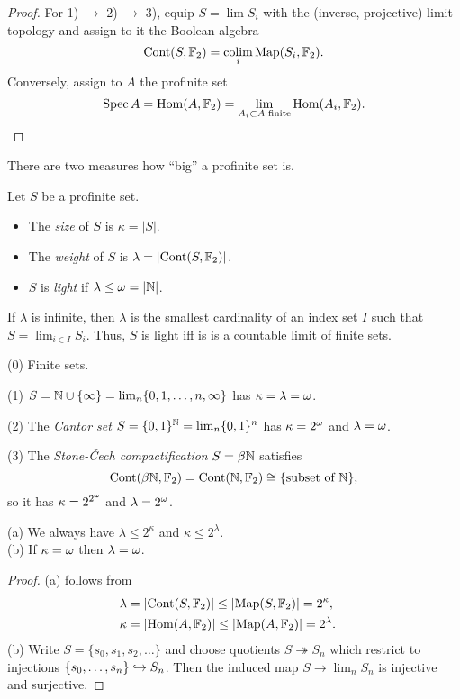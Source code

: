 \documentclass{notes}
\begin{document}
\begin{proof}
For 1) $\to$ 2) $\to$ 3), equip $S=\lim S_i$ with the (inverse,
projective) limit topology and assign to it the Boolean algebra
$$
   {\rm Cont}(S,{\mathbb{F}}_2) = \operatorname*{colim}_i{\rm Map}(S_i,{\mathbb{F}}_2).
$$
Conversely, assign to $A$ the profinite set
$$
  \operatorname{Spec} A = \mathrm{Hom}(A,{\mathbb{F}}_2) = \lim_{A_i\subset A\text{ finite}}\mathrm{Hom}(A_i,{\mathbb{F}}_2).
$$
\end{proof}

There are two measures how ``big'' a profinite set is.

\begin{defi}
Let $S$ be a profinite set. 
\begin{itemize}
\item The {\em size} of $S$ is $\kappa=|S|$.
\item The {\em weight} of $S$ is $\lambda=|{\rm Cont}(S,{\mathbb{F}}_2)|$.
\item $S$ is {\em light} if $\lambda\leq{\omega}=|{\mathbb{N}}|$.
\end{itemize}
\end{defi}

\begin{rem}
If $\lambda$ is infinite, then $\lambda$ is the smallest
  cardinality of an index set $I$ such that $S=\lim_{i\in I}S_i$.
Thus, $S$ is light iff is is a countable limit of finite sets.
\end{rem}

\begin{example}
(0) Finite sets.
  
(1) $S = {\mathbb{N}}\cup\{\infty\} = \lim_n\{0,1,\dots,n,\infty\}$ has $\kappa=\lambda={\omega}$. 

(2) The {\em Cantor set} $S = \{0,1\}^{\mathbb{N}} = \lim_n\{0,1\}^n$ has
  $\kappa=2^{\omega}$ and $\lambda={\omega}$.

(3) The {\em Stone-\v{C}ech compactification} $S=\beta{\mathbb{N}}$ satisfies 
$$
  {\rm Cont}(\beta{\mathbb{N}},{\mathbb{F}}_2) = {\rm Cont}({\mathbb{N}},{\mathbb{F}}_2) \cong \{\text{subset of }{\mathbb{N}}\},
$$
so it has $\kappa=2^{2^{\omega}}$ and $\lambda=2^{\omega}$. 
\end{example}

\begin{prop}
(a) We always have $\lambda\leq 2^\kappa$ and $\kappa\leq 2^\lambda$. \\
(b) If $\kappa={\omega}$ then $\lambda={\omega}$. 
\end{prop}

\begin{proof}
(a) follows from
\begin{align*}
  \lambda &= |{\rm Cont}(S,{\mathbb{F}}_2)| \leq |{\rm Map}(S,{\mathbb{F}}_2)| = 2^\kappa, \cr
  \kappa &= |\mathrm{Hom}(A,{\mathbb{F}}_2)| \leq |{\rm Map}(A,{\mathbb{F}}_2)| = 2^\lambda.
\end{align*}
(b) Write $S=\{s_0,s_1,s_2,\dots\}$ and choose quotients
$S\twoheadrightarrow S_n$ which restrict to injections
$\{s_0,\dots,s_n\}\hookrightarrow S_n$. Then the induced map $S\to\lim_n S_n$ is
injective and surjective.
\end{proof}
\end{document}
